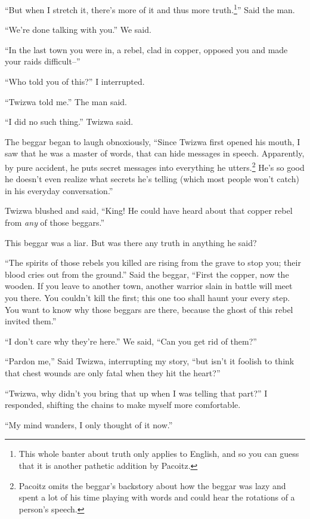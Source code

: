 ``But when I stretch it, there's more of it and thus more truth.\footnote{This whole banter about truth only applies to English, and so you can guess that it is another pathetic addition by Pacoitz.}'' Said the man.

``We're done talking with you.'' We said.

``In the last town you were in, a rebel, clad in copper, opposed you and made your raids difficult--''

``Who told you of this?'' I interrupted.

``Twizwa told me.'' The man said.

``I did no such thing.'' Twizwa said.

The beggar began to laugh obnoxiously, ``Since Twizwa first opened his mouth, I saw that he was a master of words, that can hide messages in speech. Apparently, by pure accident, he puts secret messages into everything he utters.\footnote{Pacoitz omits the beggar's backstory about how the beggar was lazy and spent a lot of his time playing with words and could hear the rotations of a person's speech.} He's so good he doesn't even realize what secrets he's telling (which most people won't catch) in his everyday conversation.''

Twizwa blushed and said, ``King! He could have heard about that copper rebel from \emph{any} of those beggars.''

This beggar was a liar. But was there any truth in anything he said?

``The spirits of those rebels you killed are rising from the grave to stop you; their blood cries out from the ground.'' Said the beggar, ``First the copper, now the wooden. If you leave to another town, another warrior slain in battle will meet you there. You couldn't kill the first; this one too shall haunt your every step. You want to know why those beggars are there, because the ghost of this rebel invited them.''
 
``I don't care why they're here.'' We said, ``Can you get rid of them?''

\tbreak

``Pardon me,'' Said Twizwa, interrupting my story, ``but isn't it foolish to think that chest wounds are only fatal when they hit the heart?''

``Twizwa, why didn't you bring that up when I was telling that part?'' I responded, shifting the chains to make myself more comfortable.

``My mind wanders, I only thought of it now.''


